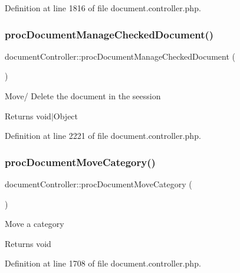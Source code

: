 Definition at line 1816 of file document.\+controller.\+php.

\hypertarget{classdocumentController_a96dee41cd75a387fee93375d33633aba}{}\label{classdocumentController_a96dee41cd75a387fee93375d33633aba} 
\subsubsection{\texorpdfstring{proc\+Document\+Manage\+Checked\+Document()}{procDocumentManageCheckedDocument()}}
{\footnotesize\ttfamily document\+Controller\+::proc\+Document\+Manage\+Checked\+Document (\begin{DoxyParamCaption}{ }\end{DoxyParamCaption})}

Move/ Delete the document in the seession \begin{DoxyReturn}{Returns}
void$\vert$\+Object 
\end{DoxyReturn}


Definition at line 2221 of file document.\+controller.\+php.

\hypertarget{classdocumentController_a6bb8b84c1f775b59f74ef8d68ba48f55}{}\label{classdocumentController_a6bb8b84c1f775b59f74ef8d68ba48f55} 
\subsubsection{\texorpdfstring{proc\+Document\+Move\+Category()}{procDocumentMoveCategory()}}
{\footnotesize\ttfamily document\+Controller\+::proc\+Document\+Move\+Category (\begin{DoxyParamCaption}{ }\end{DoxyParamCaption})}

Move a category \begin{DoxyReturn}{Returns}
void 
\end{DoxyReturn}


Definition at line 1708 of file document.\+controller.\+php.

\hypertarget{classdocumentController_a65e4d6ef48c59e92bf82e8ced4b85d4d}{}\label{classdocumentController_a65e4d6ef48c59e92bf82e8ced4b85d4d} 

